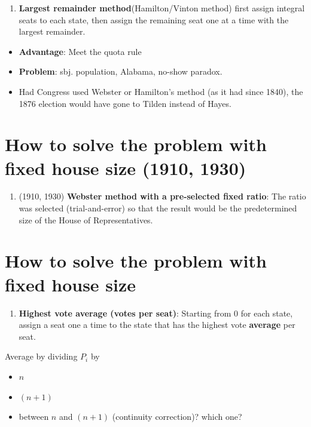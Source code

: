 \documentclass[
  letterpaper,
  DIV=11,
  numbers=noendperiod]{scrreprt}
\providecommand{\tightlist}{%
  \setlength{\itemsep}{0pt}\setlength{\parskip}{0pt}}\usepackage{longtable,booktabs,array}
\begin{document}
\begin{enumerate}
\def\labelenumi{\arabic{enumi}.}
\tightlist
\item
  \textbf{Largest remainder method}(Hamilton/Vinton method) first assign
  integral seats to each state, then assign the remaining seat one at a
  time with the largest remainder.
\end{enumerate}

\begin{itemize}
\tightlist
\item
  \textbf{Advantage}: Meet the quota rule
\item
  \textbf{Problem}: sbj. population, Alabama, no-show paradox.
\item
  Had Congress used Webster or Hamilton's method (as it had since 1840),
  the 1876 election would have gone to Tilden instead of Hayes.
\end{itemize}

\section{How to solve the problem with fixed house size (1910,
1930)}\label{how-to-solve-the-problem-with-fixed-house-size-1910-1930}

\begin{enumerate}
\def\labelenumi{\arabic{enumi}.}
\setcounter{enumi}{1}
\tightlist
\item
  (1910, 1930) \textbf{Webster method with a pre-selected fixed ratio}:
  The ratio was selected (trial-and-error) so that the result would be
  the predetermined size of the House of Representatives.
\end{enumerate}

\section{How to solve the problem with fixed house
size}\label{how-to-solve-the-problem-with-fixed-house-size}

\begin{enumerate}
\def\labelenumi{\arabic{enumi}.}
\setcounter{enumi}{2}
\tightlist
\item
  \textbf{Highest vote average (votes per seat)}: Starting from 0 for
  each state, assign a seat one a time to the state that has the highest
  vote \textbf{average} per seat.
\end{enumerate}

Average by dividing \(P_i\) by

\begin{itemize}
\tightlist
\item
  \(n\)
\item
  \((n+1)\)\\
\item
  between \(n\) and \((n+1)\) (continuity correction)? which one?
\end{itemize}
\end{document}
